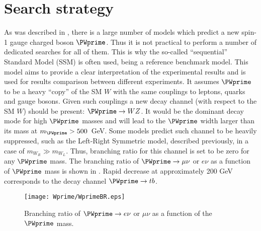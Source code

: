 


\section{Search strategy}
\label{sec:wprimeIntro}

As was described in , there is a large number of models
which predict a new spin-1 gauge charged boson $\PWprime$. Thus it is not practical to perform a number of dedicated searches for all of them. This is why the so-called ``sequential'' Standard Model (SSM) is often used, being a reference benchmark model.
This model aims to provide a clear interpretation of the experimental results and
is used for results comparison between different experiments.
It assumes $\PWprime$ to be a heavy ``copy'' of the SM $W$ with the same couplings to leptons, quarks and gauge bosons. 
Given such couplings a new decay channel (with respect to the SM $W$)
should be present: $\PWprime \to WZ$. It would be the dominant decay mode 
for high $\PWprime$ masses and will lead to the $\PWprime$ width larger
than its mass at  $m_{\PWprime} > 500$~GeV. 
Some models predict such channel to be heavily suppressed, 
such as the Left-Right Symmetric model, described previously, in a case of $m_{W_R} \gg m_{W_L}$.
Thus, branching ratio for this channel is set to be zero for any $\PWprime$ mass.
The branching ratio of $\PWprime \to \mu\nu$ or $e\nu$ as a function of $\PWprime$ mass
is shown in . Rapid decrease at approximately 200 GeV corresponds to the decay channel $\PWprime \to tb$.
\begin{figure}[!htb]
  \centering
  \texttt{[image: Wprime/WprimeBR.eps]}
  \caption{Branching ratio of $\PWprime \rightarrow e\nu$ or $\mu\nu$ as a function of the $\PWprime$ mass.}
  \label{fig:wprimeBR}
\end{figure}

